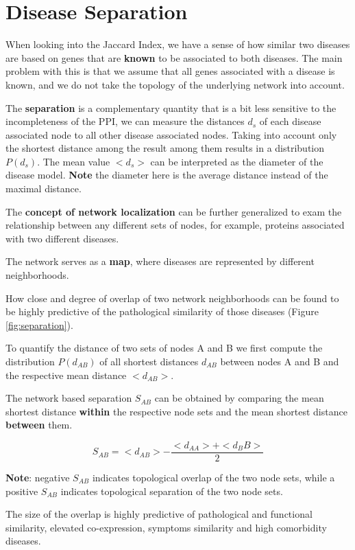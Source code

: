 \documentclass[
]{book}
\begin{document}
\hypertarget{dissep}{%
\section{Disease Separation}\label{dissep}}

When looking into the Jaccard Index, we have a sense of how similar two diseases are based on genes that are \textbf{known} to be associated to both diseases. The main problem with this is that we assume that all genes associated with a disease is known, and we do not take the topology of the underlying network into account.

The \textbf{separation} is a complementary quantity that is a bit less sensitive to the incompleteness of the PPI, we can measure the distances \(d_s\) of each disease associated node to all other disease associated nodes. Taking into account only the shortest distance among the result among them results in a distribution \(P(d_s)\). The mean value \(<d_s>\) can be interpreted as the diameter of the disease model. \textbf{Note} the diameter here is the average distance instead of the maximal distance.

The \textbf{concept of network localization} can be further generalized to exam the relationship between any different sets of nodes, for example, proteins associated with two different diseases.

The network serves as a \textbf{map}, where diseases are represented by different neighborhoods.

How close and degree of overlap of two network neighborhoods can be found to be highly predictive of the pathological similarity of those diseases \citep{Menche2015} (Figure \ref{fig:separation}).

To quantify the distance of two sets of nodes A and B we first compute the distribution \(P(d_{AB})\) of all shortest distances \(d_{AB}\) between nodes A and B and the respective mean distance \(<d_{AB}>\).

The network based separation \(S_{AB}\) can be obtained by comparing the mean shortest distance \textbf{within} the respective node sets and the mean shortest distance \textbf{between} them.

\[
S_{AB} = <d_{AB}> - \frac{<d_{AA}> + <d_BB>}{2}
\]

\textbf{Note}: negative \(S_{AB}\) indicates topological overlap of the two node sets, while a positive \(S_{AB}\) indicates topological separation of the two node sets.

The size of the overlap is highly predictive of pathological and functional similarity, elevated co-expression, symptoms similarity and high comorbidity diseases.
\end{document}
